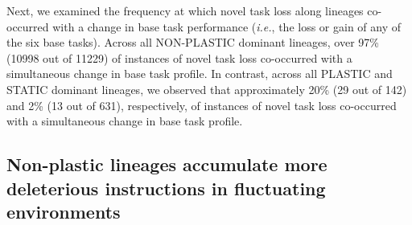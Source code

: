 
Next, we examined the frequency at which novel task loss along lineages co-occurred with a change in base task performance (\textit{i.e.}, the loss or gain of any of the six base tasks).
Across all NON-PLASTIC dominant lineages, over 97\% (10998 out of 11229) of instances of novel task loss co-occurred with a simultaneous change in base task profile.
In contrast, across all PLASTIC and STATIC dominant lineages, we observed that approximately 20\% (29 out of 142) and 2\% (13 out of 631), respectively, of instances of novel task loss co-occurred with a simultaneous change in base task profile. 


\vspace{0.5cm}
\subsection{Non-plastic lineages accumulate more deleterious instructions in fluctuating environments}


